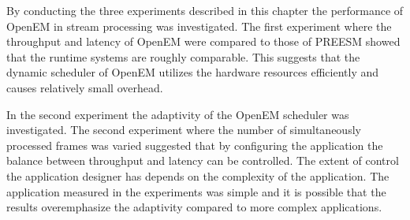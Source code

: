 \FloatBarrier
By conducting the three experiments described in this chapter the performance of OpenEM in stream processing was investigated. The first experiment where the throughput and latency of OpenEM were compared to those of PREESM showed that the runtime systems are roughly comparable. This suggests that the dynamic scheduler of OpenEM utilizes the hardware resources efficiently and causes relatively small overhead.

In the second experiment the adaptivity of the OpenEM scheduler was investigated. The second experiment where the number of simultaneously processed frames was varied suggested that by configuring the application the balance between throughput and latency can be controlled. The extent of control the application designer has depends on the complexity of the application. The application measured in the experiments was simple and it is possible that the results overemphasize the adaptivity compared to more complex applications.

